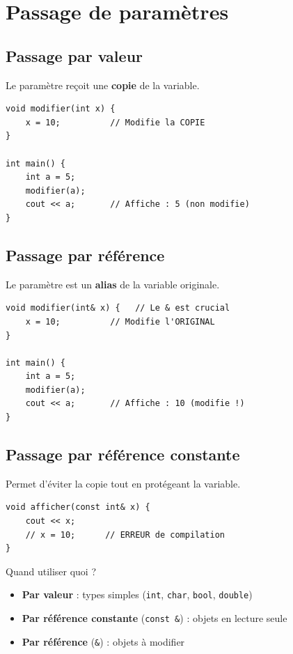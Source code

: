 \documentclass[12pt,a4paper]{article}
\begin{document}
\section{Passage de paramètres}

\subsection{Passage par valeur}

Le paramètre reçoit une \textbf{copie} de la variable.

\begin{lstlisting}[style=cpp, caption={Passage par valeur}]
void modifier(int x) {
    x = 10;          // Modifie la COPIE
}

int main() {
    int a = 5;
    modifier(a);
    cout << a;       // Affiche : 5 (non modifie)
}
\end{lstlisting}

\subsection{Passage par référence}

Le paramètre est un \textbf{alias} de la variable originale.

\begin{lstlisting}[style=cpp, caption={Passage par référence}]
void modifier(int& x) {   // Le & est crucial
    x = 10;          // Modifie l'ORIGINAL
}

int main() {
    int a = 5;
    modifier(a);
    cout << a;       // Affiche : 10 (modifie !)
}
\end{lstlisting}

\subsection{Passage par référence constante}

Permet d'éviter la copie tout en protégeant la variable.

\begin{lstlisting}[style=cpp, caption={Passage par référence constante}]
void afficher(const int& x) {
    cout << x;
    // x = 10;      // ERREUR de compilation
}
\end{lstlisting}

\begin{regle}
Quand utiliser quoi ?
\begin{itemize}
    \item \textbf{Par valeur} : types simples (\texttt{int}, \texttt{char}, \texttt{bool}, \texttt{double})
    \item \textbf{Par référence constante} (\texttt{const \&}) : objets en lecture seule
    \item \textbf{Par référence} (\texttt{\&}) : objets à modifier
\end{itemize}
\end{regle}
\end{document}
